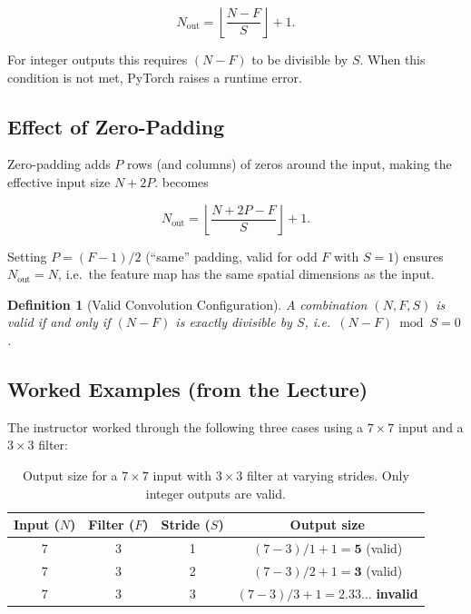 \documentclass[12pt,a4paper]{article}
\newtheorem{definition}{Definition}[section]
\begin{document}
\begin{equation}
  \boxed{N_{\text{out}} = \left\lfloor \frac{N - F}{S} \right\rfloor + 1.}
  \label{eq:output_size}
\end{equation}

For integer outputs this requires $(N - F)$ to be divisible by $S$.  When
this condition is not met, PyTorch raises a runtime error.

\subsection{Effect of Zero-Padding}
\label{subsec:padding}

Zero-padding adds $P$ rows (and columns) of zeros around the input, making
the effective input size $N + 2P$.   becomes

\begin{equation}
  N_{\text{out}} = \left\lfloor \frac{N + 2P - F}{S} \right\rfloor + 1.
  \label{eq:output_size_pad}
\end{equation}

Setting $P = (F-1)/2$ (``same'' padding, valid for odd $F$ with $S=1$)
ensures $N_{\text{out}} = N$, i.e.\ the feature map has the same spatial
dimensions as the input.

\begin{definition}[Valid Convolution Configuration]
\label{def:valid_config}
A combination $(N, F, S)$ is \emph{valid} if and only if $(N - F)$ is
exactly divisible by $S$, i.e.\ $(N - F) \bmod S = 0$.
\end{definition}

\subsection{Worked Examples (from the Lecture)}
\label{subsec:worked_examples}

The instructor worked through the following three cases using a
$7\times7$ input and a $3\times3$ filter:

\begin{table}[ht]
\centering
\caption{Output size for a $7\times7$ input with $3\times3$ filter at varying
         strides. Only integer outputs are valid.}
\label{tab:stride_examples}
\begin{tabular}{cccc}
\toprule
\textbf{Input ($N$)} & \textbf{Filter ($F$)} & \textbf{Stride ($S$)} &
\textbf{Output size} \\
\midrule
7 & 3 & 1 & $(7-3)/1 + 1 = \mathbf{5}$ \quad (valid) \\
7 & 3 & 2 & $(7-3)/2 + 1 = \mathbf{3}$ \quad (valid) \\
7 & 3 & 3 & $(7-3)/3 + 1 = 2.33\ldots$ \quad \textbf{invalid} \\
\bottomrule
\end{tabular}
\end{table}
\end{document}

